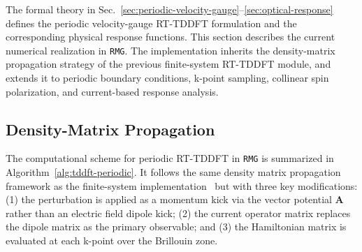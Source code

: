 

The formal theory in
Sec.~\ref{sec:periodic-velocity-gauge}--\ref{sec:optical-response}
defines the periodic velocity-gauge RT-TDDFT formulation and the
corresponding physical response functions.  This section describes the
current numerical realization in \texttt{RMG}.  The implementation
inherits the density-matrix propagation strategy of the previous
finite-system RT-TDDFT module,\cite{jakowski-rmg-tddft-2025} and extends
it to periodic boundary conditions, k-point sampling, collinear spin
polarization, and current-based response analysis.


\subsection{Density-Matrix Propagation}
\label{sec:implementation-density-matrix}

The computational scheme for periodic RT-TDDFT in \texttt{RMG}
is summarized in Algorithm~\ref{alg:tddft-periodic}.
It follows the same density matrix propagation framework as the
finite-system implementation~\cite{jakowski-rmg-tddft-2025} but
with three key modifications: (1) the perturbation is applied as
a momentum kick via the vector potential $\mathbf{A}$ rather than
an electric field dipole kick; (2) the current operator matrix
replaces the dipole matrix as the primary observable; and (3)
the Hamiltonian matrix is evaluated at each k-point over the
Brillouin zone.


